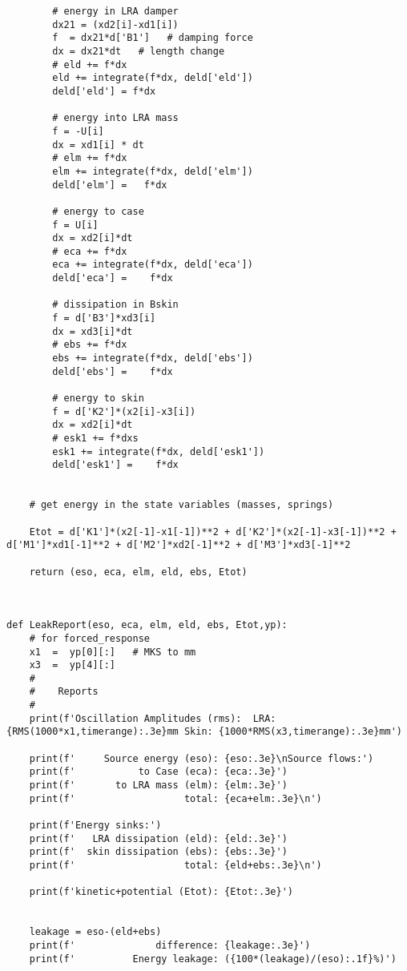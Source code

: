 \begin{verbatim}
        # energy in LRA damper
        dx21 = (xd2[i]-xd1[i])
        f  = dx21*d['B1']   # damping force
        dx = dx21*dt   # length change
        # eld += f*dx
        eld += integrate(f*dx, deld['eld'])
        deld['eld'] = f*dx

        # energy into LRA mass
        f = -U[i]
        dx = xd1[i] * dt
        # elm += f*dx
        elm += integrate(f*dx, deld['elm'])
        deld['elm'] =   f*dx

        # energy to case
        f = U[i]
        dx = xd2[i]*dt
        # eca += f*dx
        eca += integrate(f*dx, deld['eca'])
        deld['eca'] =    f*dx

        # dissipation in Bskin
        f = d['B3']*xd3[i]
        dx = xd3[i]*dt
        # ebs += f*dx
        ebs += integrate(f*dx, deld['ebs'])
        deld['ebs'] =    f*dx

        # energy to skin
        f = d['K2']*(x2[i]-x3[i])
        dx = xd2[i]*dt
        # esk1 += f*dxs
        esk1 += integrate(f*dx, deld['esk1'])
        deld['esk1'] =    f*dx


    # get energy in the state variables (masses, springs)

    Etot = d['K1']*(x2[-1]-x1[-1])**2 + d['K2']*(x2[-1]-x3[-1])**2 + d['M1']*xd1[-1]**2 + d['M2']*xd2[-1]**2 + d['M3']*xd3[-1]**2

    return (eso, eca, elm, eld, ebs, Etot)



def LeakReport(eso, eca, elm, eld, ebs, Etot,yp):
    # for forced_response
    x1  =  yp[0][:]   # MKS to mm
    x3  =  yp[4][:]
    #
    #    Reports
    #
    print(f'Oscillation Amplitudes (rms):  LRA: {RMS(1000*x1,timerange):.3e}mm Skin: {1000*RMS(x3,timerange):.3e}mm')

    print(f'     Source energy (eso): {eso:.3e}\nSource flows:')
    print(f'           to Case (eca): {eca:.3e}')
    print(f'       to LRA mass (elm): {elm:.3e}')
    print(f'                   total: {eca+elm:.3e}\n')

    print(f'Energy sinks:')
    print(f'   LRA dissipation (eld): {eld:.3e}')
    print(f'  skin dissipation (ebs): {ebs:.3e}')
    print(f'                   total: {eld+ebs:.3e}\n')

    print(f'kinetic+potential (Etot): {Etot:.3e}')


    leakage = eso-(eld+ebs)
    print(f'              difference: {leakage:.3e}')
    print(f'          Energy leakage: ({100*(leakage)/(eso):.1f}%)')
\end{verbatim}

